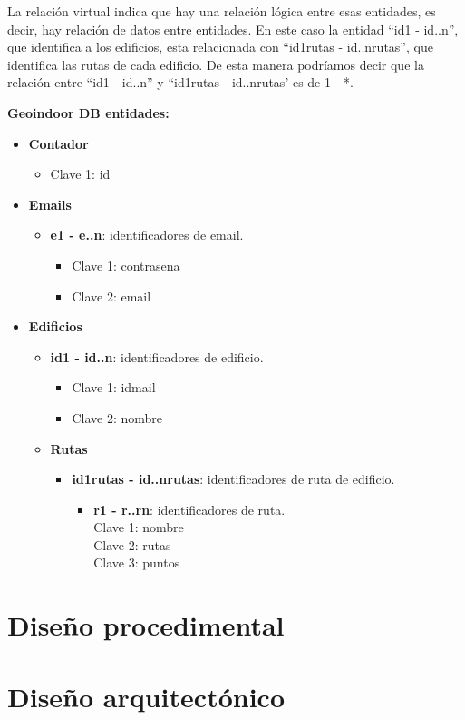 La relación virtual indica que hay una relación lógica entre esas entidades, es decir, hay relación de datos entre entidades. En este caso la entidad ``id1 - id..n'', que identifica a los edificios, esta relacionada con ``id1rutas - id..nrutas'', que identifica las rutas de cada edificio. De esta manera podríamos decir que la relación entre ``id1 - id..n'' y ``id1rutas - id..nrutas' es de 1 - *.

\newpage
\textbf{ Geoindoor DB entidades:}
\begin{itemize}
	\item \textbf{Contador}
	\begin{itemize}
		\item Clave 1: id
	\end{itemize}
	\item \textbf{Emails}
	\begin{itemize}
		\item \textbf{e1 - e..n}: identificadores de email.
		\begin{itemize}
			\item Clave 1: contrasena
			\item Clave 2: email 
		\end{itemize}
	\end{itemize}
	\item \textbf{Edificios}
	\begin{itemize}
		\item \textbf{id1 - id..n}: identificadores de edificio.
		\begin{itemize}
			\item Clave 1: idmail 
			\item Clave 2: nombre
		\end{itemize}
		\item \textbf{Rutas}
		\begin{itemize}
			\item \textbf{id1rutas - id..nrutas}: identificadores de ruta de edificio.
			\begin{itemize}
				\item \textbf{r1 - r..rn}: identificadores de ruta. \\
				\hspace{0.5cm} Clave 1: nombre \\
				\hspace{0.5cm} Clave 2: rutas\\
				\hspace{0.5cm} Clave 3: puntos \\
			\end{itemize}
		\end{itemize}
	\end{itemize}
\end{itemize}




\section{Diseño procedimental}

\section{Diseño arquitectónico}


